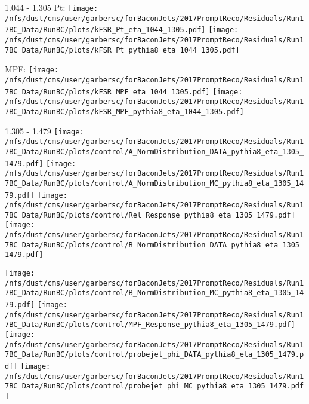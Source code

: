 \documentclass[t,compress]{beamer}
\begin{document}
\begin{frame}{1.044 - 1.305}
	 Pt: \texttt{[image: /nfs/dust/cms/user/garbersc/forBaconJets/2017PromptReco/Residuals/Run17BC\_Data/RunBC/plots/kFSR\_Pt\_eta\_1044\_1305.pdf]}
	\texttt{[image: /nfs/dust/cms/user/garbersc/forBaconJets/2017PromptReco/Residuals/Run17BC\_Data/RunBC/plots/kFSR\_Pt\_pythia8\_eta\_1044\_1305.pdf]}
\newline

	 MPF: \texttt{[image: /nfs/dust/cms/user/garbersc/forBaconJets/2017PromptReco/Residuals/Run17BC\_Data/RunBC/plots/kFSR\_MPF\_eta\_1044\_1305.pdf]}
	\texttt{[image: /nfs/dust/cms/user/garbersc/forBaconJets/2017PromptReco/Residuals/Run17BC\_Data/RunBC/plots/kFSR\_MPF\_pythia8\_eta\_1044\_1305.pdf]}
\end{frame}

\begin{frame}{1.305 - 1.479}
	\texttt{[image: /nfs/dust/cms/user/garbersc/forBaconJets/2017PromptReco/Residuals/Run17BC\_Data/RunBC/plots/control/A\_NormDistribution\_DATA\_pythia8\_eta\_1305\_1479.pdf]}
	\texttt{[image: /nfs/dust/cms/user/garbersc/forBaconJets/2017PromptReco/Residuals/Run17BC\_Data/RunBC/plots/control/A\_NormDistribution\_MC\_pythia8\_eta\_1305\_1479.pdf]}
	\texttt{[image: /nfs/dust/cms/user/garbersc/forBaconJets/2017PromptReco/Residuals/Run17BC\_Data/RunBC/plots/control/Rel\_Response\_pythia8\_eta\_1305\_1479.pdf]}
	\texttt{[image: /nfs/dust/cms/user/garbersc/forBaconJets/2017PromptReco/Residuals/Run17BC\_Data/RunBC/plots/control/B\_NormDistribution\_DATA\_pythia8\_eta\_1305\_1479.pdf]}
\newline

	\texttt{[image: /nfs/dust/cms/user/garbersc/forBaconJets/2017PromptReco/Residuals/Run17BC\_Data/RunBC/plots/control/B\_NormDistribution\_MC\_pythia8\_eta\_1305\_1479.pdf]}
	\texttt{[image: /nfs/dust/cms/user/garbersc/forBaconJets/2017PromptReco/Residuals/Run17BC\_Data/RunBC/plots/control/MPF\_Response\_pythia8\_eta\_1305\_1479.pdf]}
	\texttt{[image: /nfs/dust/cms/user/garbersc/forBaconJets/2017PromptReco/Residuals/Run17BC\_Data/RunBC/plots/control/probejet\_phi\_DATA\_pythia8\_eta\_1305\_1479.pdf]}
	\texttt{[image: /nfs/dust/cms/user/garbersc/forBaconJets/2017PromptReco/Residuals/Run17BC\_Data/RunBC/plots/control/probejet\_phi\_MC\_pythia8\_eta\_1305\_1479.pdf]}
\end{frame}
\end{document}
